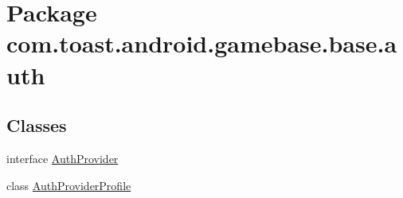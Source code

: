 \hypertarget{namespacecom_1_1toast_1_1android_1_1gamebase_1_1base_1_1auth}{}\section{Package com.\+toast.\+android.\+gamebase.\+base.\+auth}
\label{namespacecom_1_1toast_1_1android_1_1gamebase_1_1base_1_1auth}
\subsection*{Classes}
\begin{DoxyCompactItemize}
\item 
interface \hyperlink{interfacecom_1_1toast_1_1android_1_1gamebase_1_1base_1_1auth_1_1_auth_provider}{Auth\+Provider}
\item 
class \hyperlink{classcom_1_1toast_1_1android_1_1gamebase_1_1base_1_1auth_1_1_auth_provider_profile}{Auth\+Provider\+Profile}
\end{DoxyCompactItemize}

